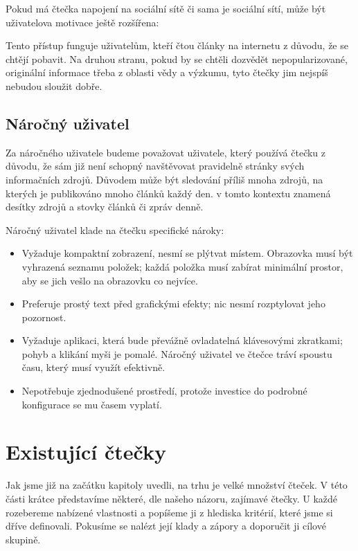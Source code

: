 Pokud má čtečka napojení na sociální sítě či sama je sociální sítí, může být uživatelova motivace ještě rozšířena:

Tento přístup funguje uživatelům, kteří čtou články na internetu z důvodu, že se chtějí pobavit.
Na druhou stranu, pokud by se chtěli dozvědět nepopularizované, originální informace třeba z oblasti vědy a výzkumu, tyto čtečky jim nejspíš nebudou sloužit dobře.

\subsection{Náročný uživatel}

Za náročného uživatele budeme považovat uživatele, který používá čtečku z důvodu, že sám již není schopný navštěvovat pravidelně stránky svých informačních zdrojů.
Důvodem může být sledování příliš mnoha zdrojů, na kterých je publikováno mnoho článků každý den.
 v tomto kontextu znamená desítky zdrojů a stovky článků či zpráv denně.

Náročný uživatel klade na čtečku specifické nároky:
\begin{itemize}
    \item Vyžaduje kompaktní zobrazení, nesmí se plýtvat místem.
        Obrazovka musí být vyhrazená seznamu položek; každá položka musí zabírat minimální prostor, aby se jich vešlo na obrazovku co nejvíce.
    \item Preferuje prostý text před grafickými efekty; nic nesmí rozptylovat jeho pozornost.
    \item Vyžaduje aplikaci, která bude převážně ovladatelná klávesovými zkratkami; pohyb a klikání myši je pomalé.
        Náročný uživatel ve čtečce tráví spoustu času, který musí využít efektivně.
    \item Nepotřebuje zjednodušené prostředí, protože investice do podrobné konfigurace se mu časem vyplatí.
\end{itemize}

\section{Existující čtečky}

Jak jsme již na začátku kapitoly uvedli, na trhu je velké množství čteček.
V této části krátce představíme některé, dle našeho názoru, zajímavé čtečky.
U každé rozebereme nabízené vlastnosti a popíšeme ji z hlediska kritérií, které jsme si dříve definovali.
Pokusíme se nalézt její klady a zápory a doporučit ji cílové skupině.

